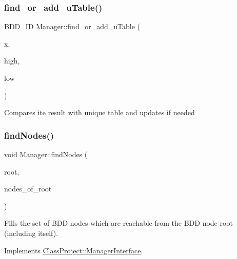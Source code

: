 \mbox{\label{classClassProject_1_1Manager_a35b9aaf1d448fdbdc2020b119d729527}} 
\subsubsection{\texorpdfstring{find\+\_\+or\+\_\+add\+\_\+u\+Table()}{find\_or\_add\_uTable()}}
{\footnotesize\ttfamily B\+D\+D\+\_\+\+ID Manager\+::find\+\_\+or\+\_\+add\+\_\+u\+Table (\begin{DoxyParamCaption}\item[{const B\+D\+D\+\_\+\+ID}]{x,  }\item[{const B\+D\+D\+\_\+\+ID}]{high,  }\item[{const B\+D\+D\+\_\+\+ID}]{low }\end{DoxyParamCaption})}

Compares ite result with unique table and updates if needed \mbox{\label{classClassProject_1_1Manager_a2aefec8f025f8d7417eff8493bcd7f04}} 
\subsubsection{\texorpdfstring{find\+Nodes()}{findNodes()}}
{\footnotesize\ttfamily void Manager\+::find\+Nodes (\begin{DoxyParamCaption}\item[{const B\+D\+D\+\_\+\+ID \&}]{root,  }\item[{std\+::set$<$ B\+D\+D\+\_\+\+ID $>$ \&}]{nodes\+\_\+of\+\_\+root }\end{DoxyParamCaption})\hspace{0.3cm}{\ttfamily [virtual]}}

Fills the set of B\+DD nodes which are reachable from the B\+DD node root (including itself). 

Implements \hyperlink{classClassProject_1_1ManagerInterface_ab460e331ffdb85d4128574b3aae72c1e}{Class\+Project\+::\+Manager\+Interface}.

